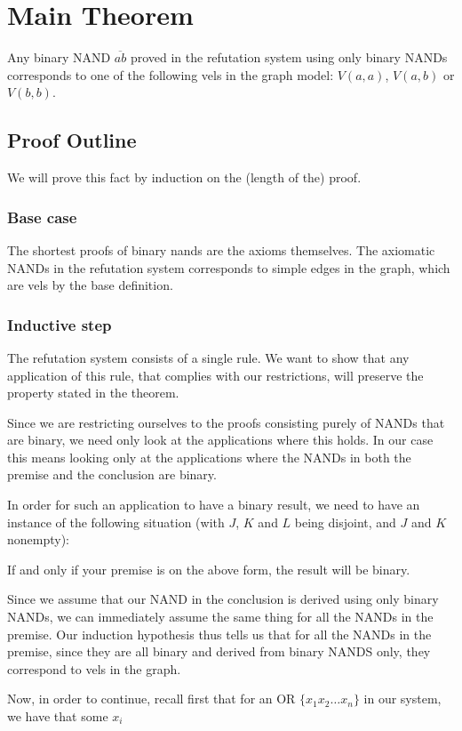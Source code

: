 \section{Main Theorem}
\label{sec:Main Theorem}
\begin{theorem}
  Any binary NAND $\overline{ab}$ proved in the refutation system using only binary NANDs corresponds to one of the following vels in the graph model:
  $V(a,a)$, $V(a,b)$ or $V(b,b)$.
\end{theorem}
\subsection{Proof Outline}
\label{sub:Proof Outline}
We will prove this fact by induction on the (length of the) proof.
\subsubsection{Base case}
\label{subs:Base case}
The shortest proofs of binary nands are the axioms themselves.
The axiomatic NANDs in the refutation system corresponds to simple edges in the graph, which are vels by the base definition.
\subsubsection{Inductive step}
\label{subs:Inductive step}
The refutation system consists of a single rule.  We want to show that any application of this rule, that complies with our restrictions, will preserve the property stated in the theorem.

Since we are restricting ourselves to the proofs consisting purely of NANDs that are binary, we need only look at the applications where this holds.
In our case this means looking only at the applications where the NANDs in both the premise and the conclusion are binary.

In order for such an application to have a binary result, we need to have an instance of the following situation (with $J$, $K$ and $L$ being disjoint, and $J$ and $K$ nonempty):
\begin{prooftree*}
\end{prooftree*}
If and only if your premise is on the above form, the result will be binary.

Since we assume that our NAND in the conclusion is derived using only binary NANDs, we can immediately assume the same thing for all the NANDs in the premise.
Our induction hypothesis thus tells us that for all the NANDs in the premise, since they are all binary and derived from binary NANDS only, they correspond to vels in the graph.

Now, in order to continue, recall first that for an OR $\{ x_1x_2 \dots x_n \}$ in our system, we have that some $x_i$ 

\pagebreak
